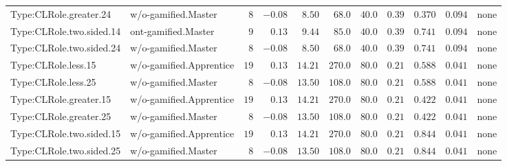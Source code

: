 \documentclass[6pt,a4paper]{article}
\begin{document}
{\begin{longtable}{llrrrrrrrrl}
Type:CLRole.greater.24&w/o-gamified.Master&$ 8$&$-0.08$&$ 8.50$&$ 68.0$&$ 40.0$&$0.39$&$0.370$&$0.094$&none\tabularnewline
Type:CLRole.two.sided.14&ont-gamified.Master&$ 9$&$ 0.13$&$ 9.44$&$ 85.0$&$ 40.0$&$0.39$&$0.741$&$0.094$&none\tabularnewline
Type:CLRole.two.sided.24&w/o-gamified.Master&$ 8$&$-0.08$&$ 8.50$&$ 68.0$&$ 40.0$&$0.39$&$0.741$&$0.094$&none\tabularnewline
Type:CLRole.less.15&w/o-gamified.Apprentice&$19$&$ 0.13$&$14.21$&$270.0$&$ 80.0$&$0.21$&$0.588$&$0.041$&none\tabularnewline
Type:CLRole.less.25&w/o-gamified.Master&$ 8$&$-0.08$&$13.50$&$108.0$&$ 80.0$&$0.21$&$0.588$&$0.041$&none\tabularnewline
Type:CLRole.greater.15&w/o-gamified.Apprentice&$19$&$ 0.13$&$14.21$&$270.0$&$ 80.0$&$0.21$&$0.422$&$0.041$&none\tabularnewline
Type:CLRole.greater.25&w/o-gamified.Master&$ 8$&$-0.08$&$13.50$&$108.0$&$ 80.0$&$0.21$&$0.422$&$0.041$&none\tabularnewline
\newpage
Type:CLRole.two.sided.15&w/o-gamified.Apprentice&$19$&$ 0.13$&$14.21$&$270.0$&$ 80.0$&$0.21$&$0.844$&$0.041$&none\tabularnewline
Type:CLRole.two.sided.25&w/o-gamified.Master&$ 8$&$-0.08$&$13.50$&$108.0$&$ 80.0$&$0.21$&$0.844$&$0.041$&none\tabularnewline
\hline
\end{longtable}}
\end{document}
